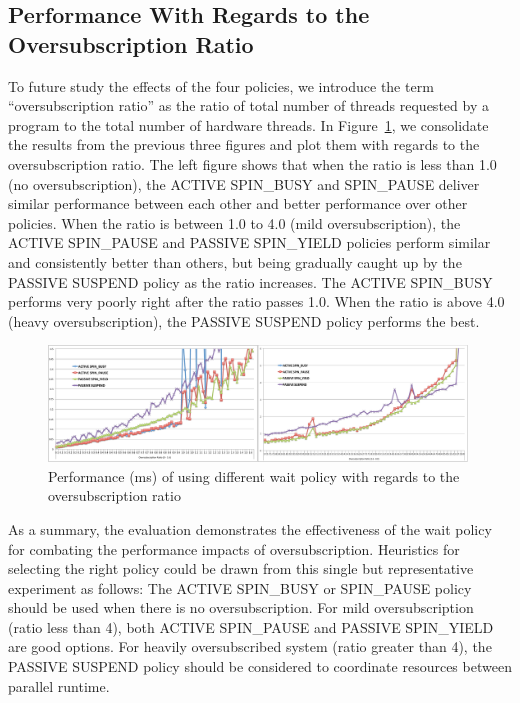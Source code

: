 \subsection{Performance With Regards to the Oversubscription Ratio}
To future study the effects of the four policies, %
we introduce the term ``oversubscription ratio'' as the ratio of total number of
threads requested by a program to the total number of hardware threads. 
In Figure~\ref{fig:ovratio}, we consolidate the results from the previous three figures and plot them with regards to 
the oversubscription ratio. The left figure shows that when the ratio is less than 1.0 (no oversubscription), 
the {\sf ACTIVE} {\sf SPIN\_BUSY} and {\sf SPIN\_PAUSE} 
deliver similar performance between each other and better performance over other policies. 
When the ratio is between 1.0 to 4.0 (mild oversubscription), the {\sf ACTIVE SPIN\_PAUSE} and {\sf PASSIVE SPIN\_YIELD} policies 
perform similar and consistently better than others, but being gradually caught up by the {\sf PASSIVE SUSPEND} policy as the ratio increases. 
The {\sf ACTIVE SPIN\_BUSY} performs very poorly right after the ratio passes 1.0. 
When the ratio is above 4.0 (heavy oversubscription), the {\sf PASSIVE SUSPEND} policy performs the best. 
\begin{figure}[h]
    \includegraphics[width=0.99\textwidth] {images/ovratio}
    \caption{Performance (ms) of using different wait policy with regards to the oversubscription ratio}
    \label{fig:ovratio}
\end{figure}

As a summary, the evaluation demonstrates the effectiveness of the wait policy for combating the performance 
impacts of oversubscription. Heuristics for selecting the right policy 
could be drawn from this single but representative experiment as follows:
The {\sf ACTIVE SPIN\_BUSY} or {SPIN\_PAUSE} policy should be used when there is no oversubscription. 
For mild oversubscription (ratio less than 4), both {\sf ACTIVE SPIN\_PAUSE} and {\sf PASSIVE SPIN\_YIELD} are good options. 
For heavily oversubscribed system (ratio greater than 4), the {\sf PASSIVE SUSPEND} policy should be 
considered to coordinate resources between parallel runtime. 

